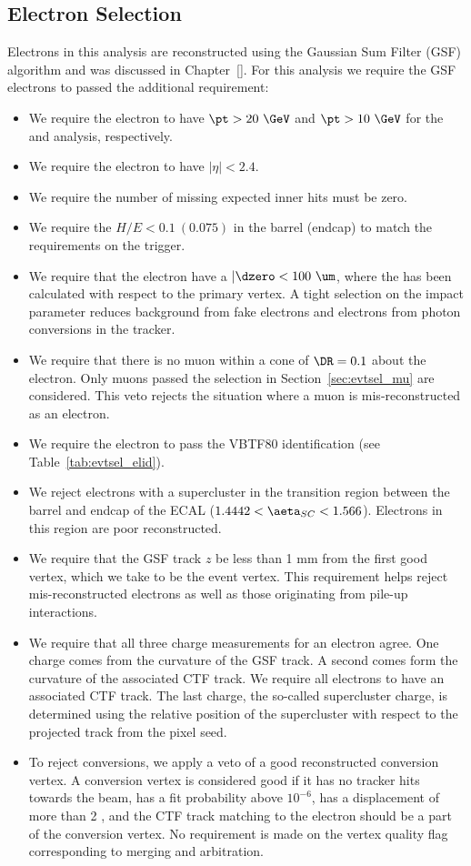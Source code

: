 \subsection{Electron Selection}
\label{sec:evtsel_el}
Electrons in this analysis are reconstructed using the Gaussian Sum Filter
(GSF) algorithm and was discussed in Chapter~\ref{}. For this analysis we
require the GSF electrons to passed the additional requirement:
\begin{itemize}
\item We require the electron to have $\pt > 20\ \GeV$ and $\pt > 10\ \GeV$ for
the \hpt and \lpt analysis, respectively.
\item We require the electron to have $|\eta| < 2.4$.
\item We require the number of missing expected inner hits must be zero.
\item We require the $H/E < 0.1\ (0.075)$ in the barrel (endcap) to match the
requirements on the trigger.
\item We require that the electron have a $|\dzero < 100\ \um$, where the
\dzero has been calculated with respect to the primary vertex. A tight
selection on the impact parameter reduces background from fake electrons and
electrons from photon conversions in the tracker.
\item We require that there is no muon within a cone of $\DR = 0.1$ about the
electron. Only muons passed the selection in Section~\ref{sec:evtsel_mu} are
considered. This veto rejects the situation where a muon is mis-reconstructed
as an electron.
\item We require the electron to pass the VBTF80 identification (see
Table~\ref{tab:evtsel_elid}).
\item We reject electrons with a supercluster \aeta in the transition region
between the barrel and endcap of the ECAL ($1.4442 < \aeta_{SC} < 1.566$).
Electrons in this region are poor reconstructed.
\item We require that the GSF track $z$ be less than 1 mm from the first
good vertex, which we take to be the event vertex. This requirement helps
reject mis-reconstructed electrons as well as those originating from pile-up
interactions.
\item We require that all three charge measurements for an electron agree.
One charge comes from the curvature of the GSF track. A second comes form the
curvature of the associated CTF track. We require all electrons to have an
associated CTF track. The last charge, the so-called supercluster charge, is
determined using the relative position of the supercluster with respect to the
projected track from the pixel seed.
\item To reject conversions, we apply a veto of a good reconstructed conversion
vertex. A conversion vertex is considered good if it has no tracker hits
towards the beam, has a fit probability above $10^{-6}$, has a displacement of
more than 2 \cm, and the CTF track matching to the electron should be a part
of the conversion vertex. No requirement is made on the vertex quality flag
corresponding to merging and arbitration.
\end{itemize}
